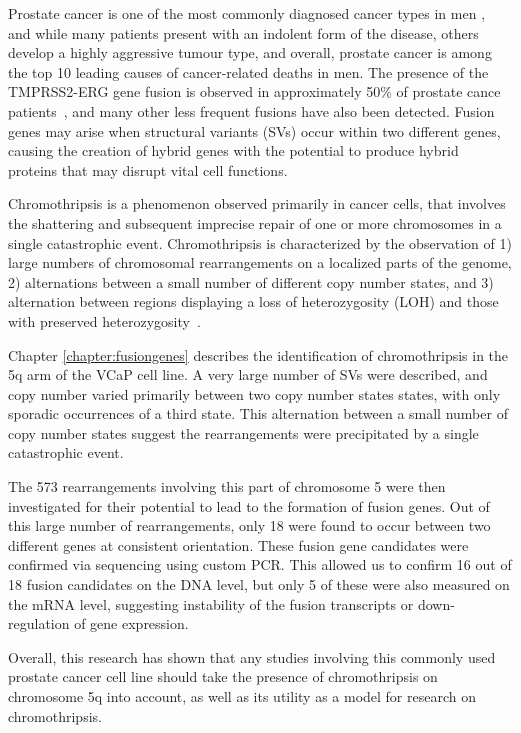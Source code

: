 Prostate cancer is one of the most commonly diagnosed cancer types in men \cite{jemal2010global}, and while many patients present with an indolent form of the disease, others develop a highly aggressive tumour type, and overall, prostate cancer is among the top 10 leading causes of cancer-related deaths in men. The presence of the TMPRSS2-ERG gene fusion is observed in approximately 50\% of prostate cance patients~\cite{tomlins2005recurrent}, and many other less frequent fusions have also been detected. Fusion genes may arise when structural variants (SVs) occur within two different genes, causing the creation of hybrid genes with the potential to produce hybrid proteins that may disrupt vital cell functions.

Chromothripsis is a phenomenon observed primarily in cancer cells, that involves the shattering and subsequent imprecise repair of one or more chromosomes in a single catastrophic event. Chromothripsis is characterized by the observation of 1) large numbers of chromosomal rearrangements on a localized parts of the genome, 2) alternations between a small number of different copy number states, and 3) alternation between regions displaying a loss of heterozygosity (LOH) and those with preserved heterozygosity~\cite{maher2012chromothripsis}.

Chapter \ref{chapter:fusiongenes} describes the identification of chromothripsis in the 5q arm of the VCaP cell line. A very large number of SVs were described, and copy number varied primarily between two copy number states states, with only sporadic occurrences of a third state. This alternation between a small number of copy number states suggest the rearrangements were precipitated by a single catastrophic event.

The 573 rearrangements involving this part of chromosome 5 were then investigated for their potential to lead to the formation of fusion genes. Out of this large number of rearrangements, only 18 were found to occur between two different genes at consistent orientation. These fusion gene candidates were confirmed via sequencing using custom PCR. This allowed us to confirm 16 out of 18 fusion candidates on the DNA level, but only 5 of these were also measured on the mRNA level, suggesting instability of the fusion transcripts or down-regulation of gene expression.

Overall, this research has shown that any studies involving this commonly used prostate cancer cell line should take the presence of chromothripsis on chromosome 5q into account, as well as its utility as a model for research on chromothripsis.

